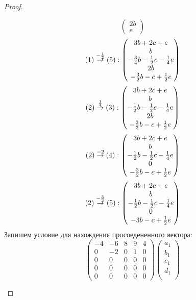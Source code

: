 \documentclass[11pt, fleqn]{article}
\begin{document}
\begin{proof}
\begin{enumerate}
\[\begin{pmatrix}
      2b\\
      e
    \end{pmatrix}\]
    $$(1) \overset{-\frac{1}{2}}{\rightarrow} (5): \begin{pmatrix}
      3b + 2c + e\\
      b\\
      -\frac{3}{4}b - \frac{1}{2}c - \frac{1}{4}e\\
      2b\\
      -\frac{3}{2}b - c + \frac{1}{2}e
    \end{pmatrix}$$
    \[(2) \overset{\frac{1}{4}}{\rightarrow} (3): \begin{pmatrix}
      3b + 2c + e\\
      b\\
      -\frac{1}{2}b - \frac{1}{2}c - \frac{1}{4}e\\
      2b\\
      -\frac{3}{2}b - c + \frac{1}{2}e
    \end{pmatrix}\]
    $$(2) \overset{-2}{\rightarrow} (4): \begin{pmatrix}
      3b + 2c + e\\
      b\\
      -\frac{1}{2}b - \frac{1}{2}c - \frac{1}{4}e\\
      0\\
      -\frac{3}{2}b - c + \frac{1}{2}e
    \end{pmatrix}$$
    \[(2) \overset{-\frac{3}{2}}{\rightarrow} (5): \begin{pmatrix}
      3b + 2c + e\\
      b\\
      -\frac{1}{2}b - \frac{1}{2}c - \frac{1}{4}e\\
      0\\
      -3b - c + \frac{1}{2}e
    \end{pmatrix}\]
    Запишем условие для нахождения просоедененного вектора:
    \[\begin{pmatrix}
      -4 & -6 & 8 & 9 & 4\\
      0 & -2 & 0 & 1 & 0\\
      0 & 0 & 0 & 0 & 0\\
      0 & 0 & 0 & 0 & 0\\
      0 & 0 & 0 & 0 & 0
    \end{pmatrix} \begin{pmatrix}
      a_1\\
      b_1\\
      c_1\\
      d_1\\

\end{pmatrix}\]
\end{enumerate}
\end{proof}
\end{document}
